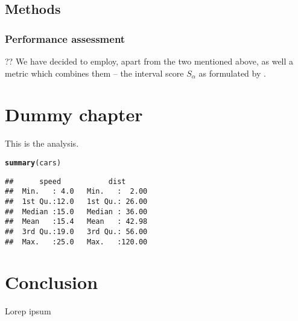 \documentclass{ctuthesis}\usepackage[]{graphicx}\usepackage[]{color}
\makeatletter
\newcommand{\hlstd}[1]{\textcolor[rgb]{0.345,0.345,0.345}{#1}}%
\newcommand{\hlkwd}[1]{\textcolor[rgb]{0.737,0.353,0.396}{\textbf{#1}}}%
\newenvironment{kframe}{%
 \def\at@end@of@kframe{}%
 \ifinner\ifhmode%
  \def\at@end@of@kframe{\end{minipage}}%
  \begin{minipage}{\columnwidth}%
 \fi\fi%
 \def\FrameCommand##1{\hskip\@totalleftmargin \hskip-\fboxsep
 \colorbox{shadecolor}{##1}\hskip-\fboxsep
     \hskip-\linewidth \hskip-\@totalleftmargin \hskip\columnwidth}%
 \MakeFramed {\advance\hsize-\width
   \@totalleftmargin\z@ \linewidth\hsize
   \@setminipage}}%
 {\par\unskip\endMakeFramed%
 \at@end@of@kframe}
\newenvironment{knitrout}{}{} %
\makeatother
\begin{document}
\section{Methods} \label{paperIIIMnM}

\subsection{Performance assessment}
?? We have decided to employ, apart from the two mentioned above,  as well a metric which combines them -- the interval score $S_\alpha$ as formulated by \cite{gneiting2007strictly}.
        


\chapter{Dummy chapter}
This is the analysis.

\begin{knitrout}
\color{fgcolor}\begin{kframe}
\begin{alltt}
\hlkwd{summary}\hlstd{(cars)}
\end{alltt}
\begin{verbatim}
##      speed           dist       
##  Min.   : 4.0   Min.   :  2.00  
##  1st Qu.:12.0   1st Qu.: 26.00  
##  Median :15.0   Median : 36.00  
##  Mean   :15.4   Mean   : 42.98  
##  3rd Qu.:19.0   3rd Qu.: 56.00  
##  Max.   :25.0   Max.   :120.00
\end{verbatim}
\end{kframe}
\end{knitrout}
        
        
        
        \chapter{Conclusion}
        Lorep ipsum \cite{doe}
        
  
    

        \small
         
        
    
\end{document}
